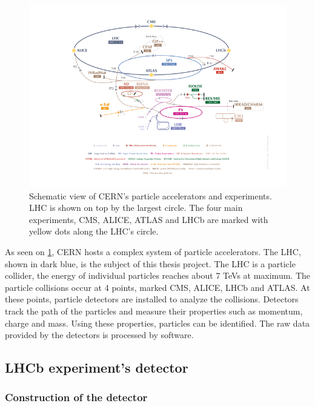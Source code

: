 \documentclass[12pt]{article}
\begin{document}
\begin{figure}[H]
	\includegraphics[width=\textwidth]{accelerator_complex}
	\caption{Schematic view of CERN's particle accelerators and experiments. LHC is shown on top by the largest circle. The four main experiments, CMS, ALICE, ATLAS and LHCb are marked with yellow dots along the LHC's circle.\cite{cern_accel_complex}}
	\label{fig_accel_complex}
\end{figure}

As seen on \ref{fig_accel_complex}, CERN hosts a complex system of particle accelerators.
The LHC, shown in dark blue, is the subject of this thesis project. The LHC is a particle collider, the energy of individual particles reaches about 7 TeVs at maximum. The particle collisions occur at 4 points, marked CMS, ALICE, LHCb and ATLAS. At these points, particle detectors are installed to analyze the collisions. Detectors track the path of the particles and measure their properties such as momentum, charge and mass. Using these properties, particles can be identified. The raw data provided by the detectors is processed by software.


\subsection{LHCb experiment's detector}\label{sec_lhcb_detector}	

\subsubsection{Construction of the detector}\label{sec_lhcb_det_constr}
\end{document}
